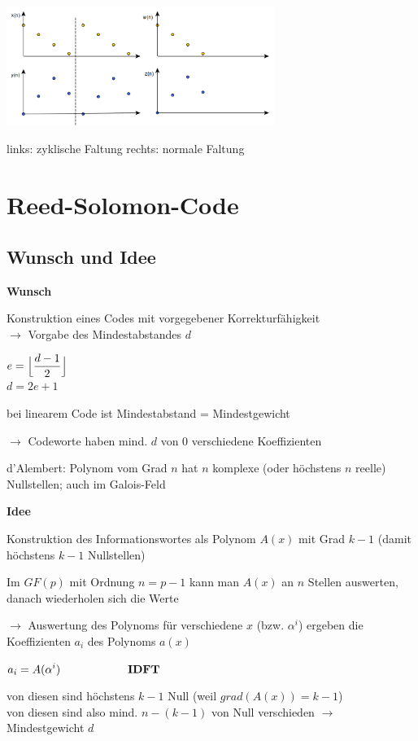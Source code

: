 \includegraphics[width=8.7cm]{img/zykische_faltung.PNG}

links: zyklische Faltung \;\;\;\;\;\;\;\;\;\;\;\; rechts: normale Faltung

\section{Reed-Solomon-Code}

\subsection{Wunsch und Idee}

\textbf{Wunsch}

Konstruktion eines Codes mit vorgegebener Korrekturfähigkeit\\
$\rightarrow$ Vorgabe des Mindestabstandes $d$

$\displaystyle{
    e = \Bigl\lfloor \frac{d - 1}{2} \Bigr\rfloor
}$\\
$\displaystyle{
    d = 2e + 1
}$

bei linearem Code ist Mindestabstand = Mindestgewicht

$\rightarrow$ Codeworte haben mind. $d$ von 0 verschiedene Koeffizienten

d'Alembert: Polynom vom Grad $n$ hat $n$ komplexe (oder höchstens $n$ reelle) Nullstellen; auch
im Galois-Feld

\textbf{Idee}

Konstruktion des Informationswortes als Polynom $A(x)$ mit Grad $k-1$ (damit höchstens $k-1$ Nullstellen)

Im $GF(p)$ mit Ordnung $n = p-1$ kann man $A(x)$ an $n$ Stellen auswerten, danach wiederholen sich die Werte

$\rightarrow$ Auswertung des Polynoms für verschiedene $x$ (bzw. $\alpha^i$) ergeben die Koeffizienten $a_i$ des
Polynoms $a(x)$

$\displaystyle{
    a_i = A(\alpha^i) \qquad\qquad\qquad \text{\textbf{IDFT}}
}$

von diesen sind höchstens $k-1$ Null (weil $grad(A(x)) = k-1$)\\
von diesen sind also mind. $n - (k-1)$ von Null verschieden $\rightarrow$ Mindestgewicht $d$

